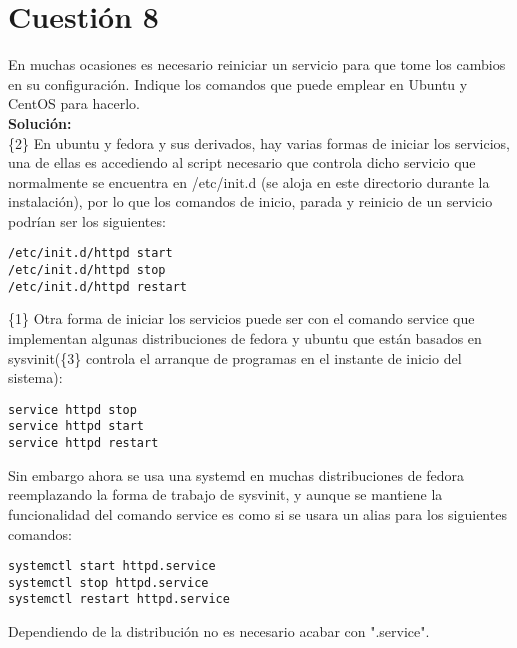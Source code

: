 \documentclass[a4paper, 11pt]{article} %
\begin{document}
\section{Cuestión 8}
En muchas ocasiones es necesario reiniciar un servicio para que tome los cambios en su configuración. Indique los comandos que puede emplear en Ubuntu y CentOS para hacerlo.\\
\textbf{Solución:}\\
\{2\} En ubuntu y fedora y sus derivados, hay varias formas de iniciar los servicios, una de ellas es accediendo al script necesario que controla dicho servicio que normalmente se encuentra en /etc/init.d (se aloja en este directorio durante la instalación), por lo que los comandos de inicio, parada y reinicio de un servicio podrían ser los siguientes:
\begin{center}
\begin{verbatim}
/etc/init.d/httpd start
/etc/init.d/httpd stop
/etc/init.d/httpd restart
\end{verbatim}
\end{center}
\{1\} Otra forma de iniciar los servicios puede ser con el comando service que implementan algunas distribuciones de fedora y ubuntu que están basados en sysvinit(\{3\} controla el arranque de programas en el instante de inicio del sistema):
\begin{center}
\begin{verbatim}
service httpd stop
service httpd start
service httpd restart
\end{verbatim}
\end{center}
Sin embargo ahora se usa una systemd en muchas distribuciones de fedora reemplazando la forma de trabajo de sysvinit, y aunque se mantiene la funcionalidad del comando service es como si se usara un alias para los siguientes comandos:
\begin{center}
\begin{verbatim}
systemctl start httpd.service
systemctl stop httpd.service
systemctl restart httpd.service
\end{verbatim}
\end{center}
Dependiendo de la distribución no es necesario acabar con ".service".
\end{document}
